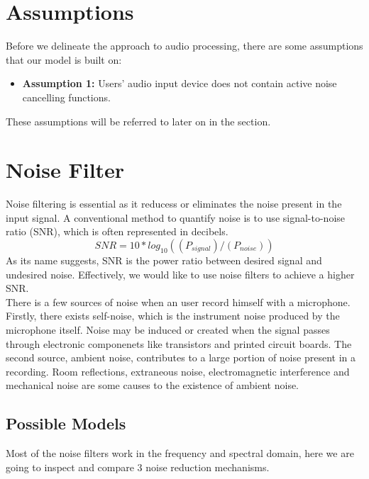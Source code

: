 \section{Assumptions}
Before we delineate the approach to audio processing, there are some assumptions that our model
is built on:
\begin{itemize}
	\item \textbf{Assumption 1:} Users' audio input device does not contain active noise cancelling functions.
\end{itemize}

These assumptions will be referred to later on in the section.
\section{Noise Filter}
Noise filtering is essential as it reducess or eliminates the noise present in the input signal.
A conventional method to quantify noise is to use signal-to-noise ratio (SNR), which is often 
represented in decibels.
\[SNR=10*log_10((P_{signal})/(P_{noise}))\]
As its name suggests, SNR is the power ratio between desired signal and undesired noise. Effectively,
we would like to use noise filters to achieve a higher SNR.\\ 
There is a few sources of noise when an user record himself with a microphone.
Firstly, there exists self-noise, which is the instrument noise produced by the microphone itself.
Noise may be induced or created when the signal passes through electronic componenets like transistors 
and printed circuit boards.\cite{selfnoise} 
The second source, ambient noise, contributes to a large portion of noise present in a recording.
Room reflections, extraneous noise, electromagnetic interference and mechanical noise are some causes 
to the existence of ambient noise. 

\subsection{Possible Models}
Most of the noise filters work in the frequency and spectral domain, here we are going to inspect and
compare 3 noise reduction mechanisms.

